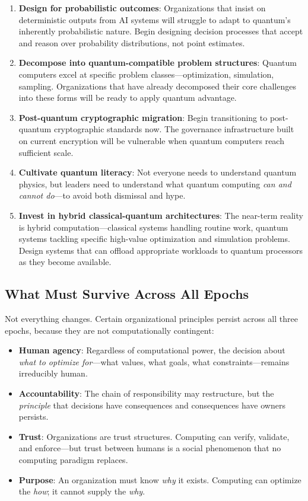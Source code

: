 \documentclass[11pt,a4paper,twocolumn]{article}
\begin{document}
\begin{enumerate}[leftmargin=1.5em]
  \item \textbf{Design for probabilistic outcomes}: Organizations that insist on deterministic outputs from AI systems will struggle to adapt to quantum's inherently probabilistic nature. Begin designing decision processes that accept and reason over probability distributions, not point estimates.

  \item \textbf{Decompose into quantum-compatible problem structures}: Quantum computers excel at specific problem classes---optimization, simulation, sampling. Organizations that have already decomposed their core challenges into these forms will be ready to apply quantum advantage.

  \item \textbf{Post-quantum cryptographic migration}: Begin transitioning to post-quantum cryptographic standards now. The governance infrastructure built on current encryption will be vulnerable when quantum computers reach sufficient scale.

  \item \textbf{Cultivate quantum literacy}: Not everyone needs to understand quantum physics, but leaders need to understand what quantum computing \textit{can and cannot do}---to avoid both dismissal and hype.

  \item \textbf{Invest in hybrid classical-quantum architectures}: The near-term reality is hybrid computation---classical systems handling routine work, quantum systems tackling specific high-value optimization and simulation problems. Design systems that can offload appropriate workloads to quantum processors as they become available.
\end{enumerate}

\subsection{What Must Survive Across All Epochs}

Not everything changes. Certain organizational principles persist across all three epochs, because they are not computationally contingent:

\begin{itemize}[leftmargin=1.5em]
  \item \textbf{Human agency}: Regardless of computational power, the decision about \textit{what to optimize for}---what values, what goals, what constraints---remains irreducibly human.
  \item \textbf{Accountability}: The chain of responsibility may restructure, but the \textit{principle} that decisions have consequences and consequences have owners persists.
  \item \textbf{Trust}: Organizations are trust structures. Computing can verify, validate, and enforce---but trust between humans is a social phenomenon that no computing paradigm replaces.
  \item \textbf{Purpose}: An organization must know \textit{why} it exists. Computing can optimize the \textit{how}; it cannot supply the \textit{why}.
\end{itemize}
\end{document}
